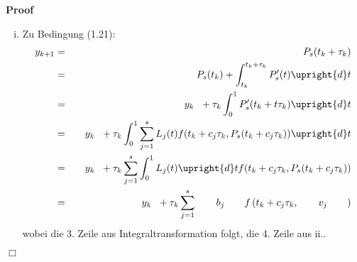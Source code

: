 \documentclass{book}
\newenvironment{enumerateroman}{\begin{enumerate}[i.] }{\end{enumerate}}
\newenvironment{proof}{\noindent\textbf{Proof\ }}{\hspace*{\fill}$\Box$\medskip}
\begin{document}
\begin{proof}
\begin{enumerateroman}
    Nach Definition vom Kollokationspolynom gilt $P_s (t_k) = y_k$, und
    zusammen mit der Integraldarstellung von Funktionen erhalten wir f{\"u}r
    jedes $i \in \{ 1, \ldots, s \}$:
    \begin{eqnarray*}
      v_i & = & P_s (t_k + c_i \tau_k)\\
      & = & y_k + \int_{t_k}^{t_k + c_i \tau_k} P'_s (t) \upright{d} t\\
      & = & y_k + \tau_k \int_0^{c_i } P'_s (t_k + t \tau_k) \upright{d} t\\
      & = & y_k + \tau_k \int_0^{c_i } \sum_{j = 1 }^s L_j (t) f (t_k + c_j
      \tau_k, P_s (t_k + c_j \tau_k)) \upright{d} t\\
      & = & y_k + \tau_k \sum_{j = 1 }^s \int_0^{c_i } L_j (t) \upright{d} t
      f (t_k + c_j \tau_k, P_s (t_k + c_j \tau_k))\\
      & = & y_k + \tau_k \sum_{j = 1 }^s \qquad a_{i j} \hspace{3.5em} f (t_k
      + c_j \tau_k, v_i),
    \end{eqnarray*}
    wobei die 3. Zeile aus Integraltransformation folgt, die 4. Zeile aus ii.
    
    Damit sehen wir auch ,,woher die Formel f{\"u}r $a_{i j}$ kommen sollte``.
    
    \item Zu Bedingung (1.21):
    \begin{eqnarray*}
      y_{k + 1} & = & P_s (t_k + \tau_k)\\
      & = & P_s (t_k) + \int_{t_k }^{t_k + \tau_k} P'_s (t) \upright{d} t\\
      & = & \text{\quad} y_k \hspace{0.6em} + \tau_k \int_0^1 P'_s (t_k + t
      \tau_k) \upright{d} t\\
      & = & \text{\quad} y_k \hspace{0.6em} + \tau_k \int_0^1 \sum_{j = 1}^s
      L_j (t) f (t_k + c_j \tau_k, P_s (t_k + c_j \tau_k)) \upright{d} t\\
      & = & \text{\quad} y_k \hspace{0.6em} + \tau_k \sum_{j = 1}^s \int_0^1
      L_j (t) \upright{d} t f (t_k + c_j \tau_k, P_s (t_k + c_j \tau_k))\\
      & = & \text{\quad} y_k \hspace{0.6em} + \tau_k \sum_{j = 1}^s
      \text{\qquad} b_j \qquad f \left( t_k + c_j \tau_k, \text{\qquad} v_j
      \qquad \right)
    \end{eqnarray*}
    wobei die 3. Zeile aus Integraltransformation folgt, die 4. Zeile aus ii..
    \ \
    

\end{enumerateroman}
\end{proof}
\end{document}
